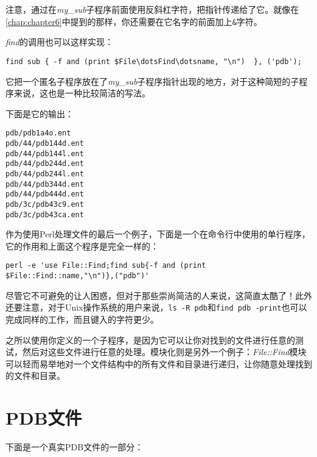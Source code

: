 注意，通过在\textit{my\_sub}子程序前面使用反斜杠字符，把指针传递给了它。就像在\autoref{chap:chapter6}中提到的那样，你还需要在它名字的前面加上\verb|&|字符。

\textit{find}的调用也可以这样实现：

\begin{lstlisting}
find sub { -f and (print $File\dotsFind\dotsname, "\n")  }, ('pdb');
\end{lstlisting}

它把一个匿名子程序放在了\textit{my\_sub}子程序指针出现的地方，对于这种简短的子程序来说，这也是一种比较简洁的写法。

下面是它的输出：

\begin{lstlisting}
pdb/pdb1a4o.ent
pdb/44/pdb144d.ent
pdb/44/pdb144l.ent
pdb/44/pdb244d.ent
pdb/44/pdb244l.ent
pdb/44/pdb344d.ent
pdb/44/pdb444d.ent
pdb/3c/pdb43c9.ent
pdb/3c/pdb43ca.ent
\end{lstlisting}

作为使用Perl处理文件的最后一个例子，下面是一个在命令行中使用的单行程序，它的作用和上面这个程序是完全一样的：

\begin{lstlisting}
perl -e 'use File::Find;find sub{-f and (print $File::Find::name,"\n")},("pdb")'
\end{lstlisting}

尽管它不可避免的让人困惑，但对于那些崇尚简洁的人来说，这简直太酷了！此外还要注意，对于Unix操作系统的用户来说，\verb|ls -R pdb|和\verb|find pdb -print|也可以完成同样的工作，而且键入的字符更少。

之所以使用你定义的一个子程序，是因为它可以让你对找到的文件进行任意的测试，然后对这些文件进行任意的处理。模块化则是另外一个例子：\textit{File::Find}模块可以轻而易举地对一个文件结构中的所有文件和目录进行递归，让你随意处理找到的文件和目录。

\section{PDB文件}
下面是一个真实PDB文件的一部分：

